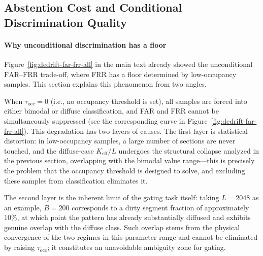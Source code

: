 \subsection{Abstention Cost and Conditional Discrimination Quality}
\label{sec:appendix-gating-tristate}

\paragraph{Why unconditional discrimination has a floor}
Figure~\ref{fig:dedrift-far-frr-all} in the main text already showed the unconditional $\mathrm{FAR}$--$\mathrm{FRR}$ trade-off, where FRR has a floor determined by low-occupancy samples. This section explains this phenomenon from two angles.

When $\tau_{\text{occ}}{=}0$ (i.e., no occupancy threshold is set), all samples are forced into either bimodal or diffuse classification, and FAR and FRR cannot be simultaneously suppressed (see the corresponding curve in Figure~\ref{fig:dedrift-far-frr-all}). This degradation has two layers of causes. The first layer is statistical distortion: in low-occupancy samples, a large number of sections are never touched, and the diffuse-case $K_{\text{eff}}/L$ undergoes the structural collapse analyzed in the previous section, overlapping with the bimodal value range---this is precisely the problem that the occupancy threshold is designed to solve, and excluding these samples from classification eliminates it.

The second layer is the inherent limit of the gating task itself: taking $L{=}2048$ as an example, $B{=}200$ corresponds to a dirty segment fraction of approximately
10\%, at which point the pattern has already substantially diffused and exhibits genuine overlap with the diffuse class. Such overlap stems from the physical convergence of the two regimes in this parameter range and cannot be eliminated by raising $\tau_{\text{occ}}$; it constitutes an unavoidable ambiguity zone for gating.

